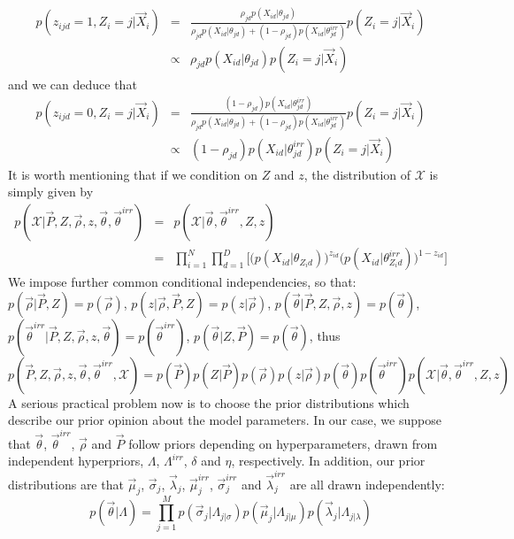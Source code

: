 \documentclass[journal,10pt]{elsart}
\begin{document}
\begin{eqnarray}
\nonumber p(z_{ijd}=1,Z_i=j|\vec{X}_i) &=& \frac{\rho_{jd} p(X_{id}|\theta_{jd})}{\rho_{jd} p(X_{id}|\theta_{jd})+(1-\rho_{jd}) p(X_{id}|\theta^{irr}_{jd})}p(Z_i=j|\vec{X}_i)\\&\propto& \rho_{jd} p(X_{id}|\theta_{jd}) p(Z_i=j|\vec{X}_i)
\end{eqnarray}
and we can deduce that
\begin{eqnarray}
\nonumber p(z_{ijd}=0,Z_i=j|\vec{X}_i) &=& \frac{(1-\rho_{jd}) p(X_{id}|\theta^{irr}_{jd})}{\rho_{jd} p(X_{id}|\theta_{jd})+(1-\rho_{jd}) p(X_{id}|\theta^{irr}_{jd})}p(Z_i=j|\vec{X}_i)\\&\propto& (1-\rho_{jd}) p(X_{id}|\theta^{irr}_{jd}) p(Z_i=j|\vec{X}_i)
\end{eqnarray}
It is worth mentioning that if we condition on $Z$ and $z$, the distribution of $\mathcal{X}$ is simply given by
\begin{eqnarray}
\nonumber p(\mathcal{X}|\vec{P},Z,\vec{\rho},z,\vec{\theta},\vec{\theta}^{irr})&=&p(\mathcal{X}|\vec{\theta},\vec{\theta}^{irr},Z,z)\\&=&\prod_{i=1}^N\prod_{d=1}^D \bigg[\big(p(X_{id}|\theta_{Z_id})\big)^{z_{id}} \big(p(X_{id}|\theta^{irr}_{Z_id})\big)^{1-z_{id}}\bigg]
\end{eqnarray}
We impose further common conditional independencies, so that: $p(\vec{\rho}|\vec{P},Z)=p(\vec{\rho})$, $p(z|\vec{\rho},\vec{P},Z)=p(z|\vec{\rho})$, $p(\vec{\theta}|\vec{P},Z,\vec{\rho},z)=p(\vec{\theta})$, $p(\vec{\theta}^{irr}|\vec{P},Z,\vec{\rho},z,\vec{\theta})=p(\vec{\theta}^{irr})$, $p(\vec{\theta}|Z,\vec{P})=p(\vec{\theta})$, thus
\begin{equation} p(\vec{P},Z,\vec{\rho},z,\vec{\theta},\vec{\theta}^{irr},\mathcal{X})=p(\vec{P})p(Z|\vec{P})p(\vec{\rho})p(z|\vec{\rho})p(\vec{\theta})p(\vec{\theta}^{irr})
p(\mathcal{X}|\vec{\theta},\vec{\theta}^{irr},Z,z)
\end{equation}
A serious practical problem now is to choose the prior distributions which describe our prior opinion about the model parameters. In our case, we suppose that $\vec{\theta}$, $\vec{\theta}^{irr}$, $\vec{\rho}$ and $\vec{P}$ follow priors depending on hyperparameters, drawn from independent hyperpriors, $\Lambda$, $\Lambda^{irr}$, $\delta$ and $\eta$, respectively. In addition, our prior distributions are that $\vec{\mu}_j$, $\vec{\sigma}_j$, $\vec{\lambda}_j$, $\vec{\mu}_j^{irr}$, $\vec{\sigma}_j^{irr}$ and $\vec{\lambda}_j^{irr}$ are all drawn independently:
\begin{equation}
p(\vec{\theta}|\Lambda)=\prod_{j=1}^M p(\vec{\sigma}_j|\Lambda_{j|\sigma})p(\vec{\mu}_{j}|\Lambda_{j|\mu})p(\vec{\lambda}_j|\Lambda_{j|\lambda})
\end{equation}
\end{document}
